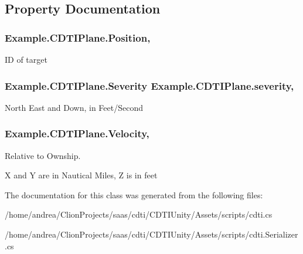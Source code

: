 \subsection{Property Documentation}
\subsubsection[{\texorpdfstring{Position}{Position}}]{ Example.\+C\+D\+T\+I\+Plane.\+Position\hspace{0.3cm}{\ttfamily [get]}, {\ttfamily [set]}}\hypertarget{class_example_1_1_c_d_t_i_plane_a4d6766b3ddf6726e0b6beda5f7044f39}{}\label{class_example_1_1_c_d_t_i_plane_a4d6766b3ddf6726e0b6beda5f7044f39}


ID of target

\subsubsection[{\texorpdfstring{severity}{severity}}]{\setlength{\rightskip}{0pt plus 5cm}Example.\+C\+D\+T\+I\+Plane.\+Severity Example.\+C\+D\+T\+I\+Plane.\+severity\hspace{0.3cm}{\ttfamily [get]}, {\ttfamily [set]}}\hypertarget{class_example_1_1_c_d_t_i_plane_ac51cdc50b63036c15eb1dc03f9d8369c}{}\label{class_example_1_1_c_d_t_i_plane_ac51cdc50b63036c15eb1dc03f9d8369c}


North East and Down, in Feet/\+Second

\subsubsection[{\texorpdfstring{Velocity}{Velocity}}]{ Example.\+C\+D\+T\+I\+Plane.\+Velocity\hspace{0.3cm}{\ttfamily [get]}, {\ttfamily [set]}}\hypertarget{class_example_1_1_c_d_t_i_plane_a52e1d4c9df3e1b3b5f281bbac9e49269}{}\label{class_example_1_1_c_d_t_i_plane_a52e1d4c9df3e1b3b5f281bbac9e49269}




Relative to Ownship.

X and Y are in Nautical Miles, Z is in feet

The documentation for this class was generated from the following files\+:\begin{DoxyCompactItemize}
\item 
/home/andrea/\+Clion\+Projects/saas/cdti/\+C\+D\+T\+I\+Unity/\+Assets/scripts/cdti.\+cs\item 
/home/andrea/\+Clion\+Projects/saas/cdti/\+C\+D\+T\+I\+Unity/\+Assets/scripts/cdti.\+Serializer.\+cs\end{DoxyCompactItemize}
